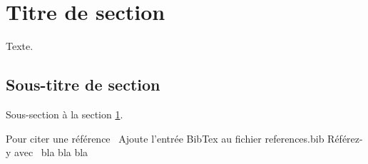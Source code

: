 \newpage
\section{Titre de section}\label{sec:nom-de-section}
Texte.

\subsection{Sous-titre de section}\label{sec:nom-de-sous-section}
Sous-section à la section \ref{sec:nom-de-section}.



Pour citer une référence~\cite{butt2023cloud}
Ajoute l'entrée BibTex au fichier references.bib
Référez-y avec~\cite{foundjem2017towards} bla bla bla